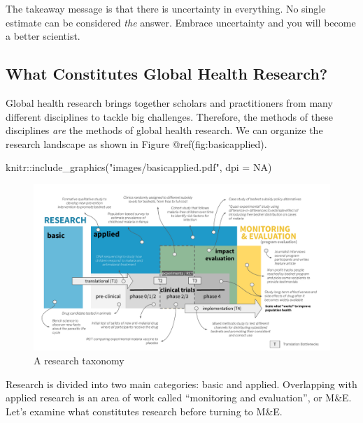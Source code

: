 \documentclass[
  letterpaper,
  DIV=11,
  numbers=noendperiod,
  oneside]{scrartcl}
\newenvironment{Shaded}{\begin{snugshade}}{\end{snugshade}}
\newcommand{\AttributeTok}[1]{\textcolor[rgb]{0.40,0.45,0.13}{#1}}
\newcommand{\ConstantTok}[1]{\textcolor[rgb]{0.56,0.35,0.01}{#1}}
\newcommand{\FunctionTok}[1]{\textcolor[rgb]{0.28,0.35,0.67}{#1}}
\newcommand{\NormalTok}[1]{\textcolor[rgb]{0.00,0.23,0.31}{#1}}
\newcommand{\SpecialCharTok}[1]{\textcolor[rgb]{0.37,0.37,0.37}{#1}}
\newcommand{\StringTok}[1]{\textcolor[rgb]{0.13,0.47,0.30}{#1}}
\begin{document}
The takeaway message is that there is uncertainty in everything. No
single estimate can be considered \emph{the} answer. Embrace uncertainty
and you will become a better scientist.

\hypertarget{what-constitutes-global-health-research}{%
\subsection{What Constitutes Global Health
Research?}\label{what-constitutes-global-health-research}}

Global health research brings together scholars and practitioners from
many different disciplines to tackle big challenges. Therefore, the
methods of these disciplines \emph{are} the methods of global health
research. We can organize the research landscape as shown in Figure
@ref(fig:basicapplied).

\begin{Shaded}
\begin{Highlighting}[]
\NormalTok{knitr}\SpecialCharTok{::}\FunctionTok{include\_graphics}\NormalTok{(}\StringTok{"images/basicapplied.pdf"}\NormalTok{, }\AttributeTok{dpi =} \ConstantTok{NA}\NormalTok{)}
\end{Highlighting}
\end{Shaded}

\begin{figure}[H]

{\centering \includegraphics{images/basicapplied.pdf}

}

\caption{A research taxonomy}

\end{figure}

Research is divided into two main categories: basic and applied.
Overlapping with applied research is an area of work called ``monitoring
and evaluation'', or M\&E. Let's examine what constitutes research
before turning to M\&E.
\end{document}
